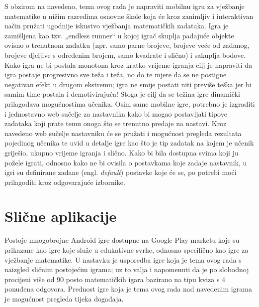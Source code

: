 \documentclass[times, utf8, zavrsni, numeric]{fer}
\begin{document}
S obzirom na navedeno, tema ovog rada je napraviti mobilnu igru za vježbanje matematike u nižim razredima osnovne škole koja će kroz zanimljiv i interaktivan način pružati  ugodnije iskustvo
vježbanja matematičkih zadataka. Igra je zamišljena kao tzv. „endless runner“ u kojoj igrač skuplja padajuće objekte ovisno o trenutnom zadatku (npr. samo parne brojeve, brojeve veće od zadanog,
brojeve djeljive s određenim brojem, samo kvadrate i slično) i sakuplja bodove. Kako igra ne bi postala monotona kroz kratko vrijeme igranja cilj je napraviti da igra postaje progresivno sve teža
i teža, no do te mjere da se ne postigne negativan efekt u drugom ekstremu; igra ne smije postati niti previše teška jer bi samim time postala i demotivirajuća! Stoga je cilj da se težina igre
dinamički prilagođava mogućnostima učenika. Osim same mobilne igre, potrebno je izgraditi i jednostavno web sučelje za nastavnika kako bi mogao postavljati tipove zadataka koji prate temu onoga što
se trenutno predaje na nastavi. Kroz navedeno web sučelje nastavniku će se pružati i mogućnost pregleda rezultata pojedinog učenika te uvid u detalje igre kao što je tip zadatak na kojem je učenik 
griješio, ukupno vrijeme igranja i slično. Kako bi bila dostupna svima koji ju požele igrati, odnosno kako ne bi ovisila o postavkama koje zadaje nastavnik, u igri su definirane zadane (engl. \textit{default}) postavke
koje će se, po potrebi moći prilagoditi kroz odgovarajuće izbornike.


\chapter{Slične aplikacije}
Postoje mnogobrojne Android igre dostupne na Google Play marketu koje su prikazane kao igre koje služe u edukativne svrhe, odnosno specifično kao igre za vježbanje matematike.  U nastavku je usporedba igre koja je tema ovog rada s naizgled 
sličnim postojećim igrama; uz to valja i napomenuti da je po slobodnoj procijeni više od 90 posto matematičkih igara bazirano na tipu kviza s 4 ponuđena odgovora. Prednost igre koja je tema ovog rada nad navedenim igrama je mogućnost pregleda tijeka događaja.
	
\end{document}
